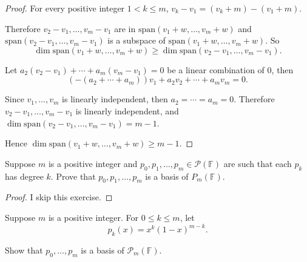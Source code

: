 \begin{proof}
    For every positive integer $1 < k \leq m$, $v_{k} - v_{1} = (v_{k} + m) - (v_{1} + m)$.

    Therefore $v_{2} - v_{1}, \ldots, v_{m} - v_{1}$ are in $\text{span}(v_{1} + w, \ldots, v_{m} + w)$ and $\text{span}(v_{2} - v_{1}, \ldots, v_{m} - v_{1})$ is a subspace of $\text{span}(v_{1} + w, \ldots, v_{m} + w)$. So
    \[
        \dim \text{span}(v_{1}+w, \ldots, v_{m}+w) \geq \dim\text{span}(v_{2} - v_{1}, \ldots, v_{m} - v_{1}).
    \]

    Let $a_{2}(v_{2} - v_{1}) + \cdots + a_{m}(v_{m} - v_{1}) = 0$ be a linear combination of $0$, then
    \[
        (-(a_{2} + \cdots + a_{m}))v_{1} + a_{2}v_{2} + \cdots + a_{m}v_{m} = 0.
    \]

    Since $v_{1}, \ldots, v_{m}$ is linearly independent, then $a_{2} = \cdots = a_{m} = 0$. Therefore $v_{2} - v_{1}, \ldots, v_{m} - v_{1}$ is linearly independent, and $\dim \text{span}(v_{2} - v_{1}, \ldots, v_{m} - v_{1}) = m - 1$.

    Hence $\dim \text{span}(v_{1} + w, \ldots, v_{m} + w)\geq m - 1$.
\end{proof}

\begin{exercise}
    Suppose $m$ is a positive integer and $p_{0}, p_{1}, \ldots, p_{m} \in \mathcal{P}(\mathbb{F})$ are such that each $p_{k}$ has degree $k$. Prove that $p_{0}, p_{1}, \ldots, p_{m}$ is a basis of $P_{m} (\mathbb{F})$.
\end{exercise}

\begin{proof}
    I skip this exercise.
\end{proof}

\begin{exercise}
    Suppose $m$ is a positive integer. For $0 \leq k \leq m$, let
    \[
        p_{k}(x) = x^{k}{(1-x)}^{m-k}.
    \]

    Show that $p_{0}, \ldots, p_{m}$ is a basis of $\mathcal{P}_{m}(\mathbb{F})$.
\end{exercise}

